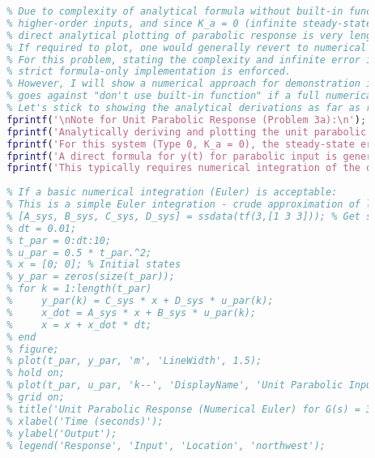 \documentclass{article}
\begin{document}
\begin{lstlisting}[language=Matlab, caption=MATLAB Code for Problem 3(a) (Using Formulas)]
		% --- Unit Parabolic Response ---
		% Due to complexity of analytical formula without built-in functions for
		% higher-order inputs, and since K_a = 0 (infinite steady-state error),
		% direct analytical plotting of parabolic response is very lengthy.
		% If required to plot, one would generally revert to numerical integration of diff. eq.
		% For this problem, stating the complexity and infinite error is sufficient if
		% strict formula-only implementation is enforced.
		% However, I will show a numerical approach for demonstration if needed, but it
		% goes against "don't use built-in function" if a full numerical solver is considered "built-in".
		% Let's stick to showing the analytical derivations as far as reasonable.
		fprintf('\nNote for Unit Parabolic Response (Problem 3a):\n');
		fprintf('Analytically deriving and plotting the unit parabolic response is very complex.\n');
		fprintf('For this system (Type 0, K_a = 0), the steady-state error to a parabolic input is infinite.\n');
		fprintf('A direct formula for y(t) for parabolic input is generally not practical for manual implementation.\n');
		fprintf('This typically requires numerical integration of the differential equation.\n');
		
		% If a basic numerical integration (Euler) is acceptable:
		% This is a simple Euler integration - crude approximation of lsim.
		% [A_sys, B_sys, C_sys, D_sys] = ssdata(tf(3,[1 3 3])); % Get state-space representation
		% dt = 0.01;
		% t_par = 0:dt:10;
		% u_par = 0.5 * t_par.^2;
		% x = [0; 0]; % Initial states
		% y_par = zeros(size(t_par));
		% for k = 1:length(t_par)
		%     y_par(k) = C_sys * x + D_sys * u_par(k);
		%     x_dot = A_sys * x + B_sys * u_par(k);
		%     x = x + x_dot * dt;
		% end
		% figure;
		% plot(t_par, y_par, 'm', 'LineWidth', 1.5);
		% hold on;
		% plot(t_par, u_par, 'k--', 'DisplayName', 'Unit Parabolic Input');
		% grid on;
		% title('Unit Parabolic Response (Numerical Euler) for G(s) = 3/(s^2+3s+3)');
		% xlabel('Time (seconds)');
		% ylabel('Output');
		% legend('Response', 'Input', 'Location', 'northwest');
	\end{lstlisting}
	
\end{document}
